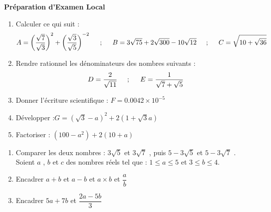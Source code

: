 \documentclass[a4paper,12pt]{article}
\begin{document}
\begin{tcolorbox}[enhanced,colback=white,colframe=black] 
{\begin{center}\Large \textbf{ Préparation d'Examen Local  }\end{center}}
\end{tcolorbox}
\begin{exo}
\begin{enumerate}
\item Calculer ce qui suit :
$$
A=\left( \dfrac{\sqrt{7}}{\sqrt{3}}\right)^{2}+\left( \dfrac{\sqrt{3}}{\sqrt{5}}\right)^{-2}  
\hspace{0.5cm};\hspace{0.5cm}
B=3\sqrt{75}+2\sqrt{300}-10\sqrt{12}
\hspace{0.5cm};\hspace{0.5cm}
C=\sqrt{10+\sqrt{36}}
$$
\item Rendre rationnel les dénominateurs des nombres suivants : 
$$
D=\dfrac{2}{\sqrt{11}}
\hspace{0.5cm};\hspace{0.5cm}
E=\dfrac{1}{\sqrt{7}+\sqrt{5}}
$$
\item Donner l'écriture scientifique : $F=0.0042 \times 10^{-5}$
\item Développer  :$G=(\sqrt{3}-a)^{2}+2(1+\sqrt{3}a)$ 
\item Factoriser : $(100-a^{2})+2(10+a)$
\end{enumerate}
\end{exo}

\begin{exo}
\begin{enumerate}
\item Comparer les deux nombres : $3\sqrt{5}$ et $3\sqrt{7}$ , puis  $5-3\sqrt{5}$ et $5-3\sqrt{7}$ .\newline
Soient $a$ , $b$ et $c$ des nombres réels tel que  : $1\leq a \leq 5$ et $3\leq b \leq 4$.
\item Encadrer $a+b$ et $a-b$ et $a\times b$ et $\dfrac{a}{b}$
\item Encadrer $5a+7b$ et $\dfrac{2a-5b}{3}$
\end{enumerate}
\end{exo}
\end{document}
